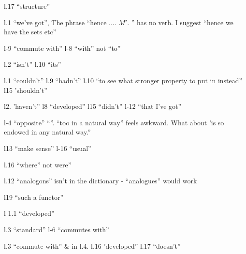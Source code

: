 \begin{minipage}{\linewidth}
\noindent{}l.17 ``structure\uline{}''

\noindent{}l.1 ``we've got'', The phrase ``hence .... $M'$. ''  has no verb. I suggest ``hence we have the sets etc''

\noindent{}l-9 ``commute with'' l-8 ``with'' not ``to''

\noindent{}l.2 ``isn't'' l.10 ``its''

\noindent{}l.1 ``couldn't'' l.9 ``hadn't'' l.10 ``to see what  stronger property to put in instead'' l15 'shouldn't''

\noindent{}l2. 'haven't'' l8 ``developed'' l15 ``didn't'' l-12 ``that I've got''

\noindent l-4 ``opposite'' ``''. ``too in a natural way'' feels awkward. What about 'is so endowed in any natural way.''

\noindent{}l13 ``make sense'' l-16 ``usual''

\noindent{}l.16 ``where'' not were''

\noindent{}l.12 ``analogons'' isn't in the dictionary - ``analogues'' would work

\noindent l19 ``such a functor''

\noindent{}l 1.1 ``developed''

\noindent{}l.3 ``standard'' l-6 ``commutes with''

\noindent{}l.3 ``commute with'' \& in l.4. l.16 'developed'' l.17 ``doesn't''


\end{minipage}
